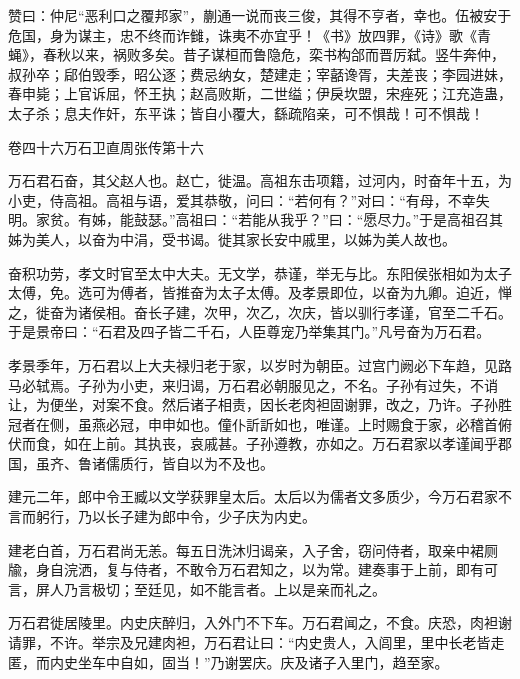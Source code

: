 \documentclass[12pt,UTF8]{ctexbook}
\begin{document}
赞曰：仲尼“恶利口之覆邦家”，蒯通一说而丧三俊，其得不亨者，幸也。伍被安于危国，身为谋主，忠不终而诈雠，诛夷不亦宜乎！《书》放四罪，《诗》歌《青蝇》，春秋以来，祸败多矣。昔子谋桓而鲁隐危，栾书构郃而晋厉弑。竖牛奔仲，叔孙卒；郈伯毁季，昭公逐；费忌纳女，楚建走；宰嚭谗胥，夫差丧；李园进妹，春申毙；上官诉屈，怀王执；赵高败斯，二世缢；伊戾坎盟，宋痤死；江充造蛊，太子杀；息夫作奸，东平诛；皆自小覆大，繇疏陷亲，可不惧哉！可不惧哉！





卷四十六万石卫直周张传第十六



万石君石奋，其父赵人也。赵亡，徙温。高祖东击项籍，过河内，时奋年十五，为小吏，侍高祖。高祖与语，爱其恭敬，问曰：“若何有？”对曰：“有母，不幸失明。家贫。有姊，能鼓瑟。”高祖曰：“若能从我乎？”曰：“愿尽力。”于是高祖召其姊为美人，以奋为中涓，受书谒。徙其家长安中戚里，以姊为美人故也。



奋积功劳，孝文时官至太中大夫。无文学，恭谨，举无与比。东阳侯张相如为太子太傅，免。选可为傅者，皆推奋为太子太傅。及孝景即位，以奋为九卿。迫近，惮之，徙奋为诸侯相。奋长子建，次甲，次乙，次庆，皆以驯行孝谨，官至二千石。于是景帝曰：“石君及四子皆二千石，人臣尊宠乃举集其门。”凡号奋为万石君。



孝景季年，万石君以上大夫禄归老于家，以岁时为朝臣。过宫门阙必下车趋，见路马必轼焉。子孙为小吏，来归谒，万石君必朝服见之，不名。子孙有过失，不诮让，为便坐，对案不食。然后诸子相责，因长老肉袒固谢罪，改之，乃许。子孙胜冠者在侧，虽燕必冠，申申如也。僮仆訢訢如也，唯谨。上时赐食于家，必稽首俯伏而食，如在上前。其执丧，哀戚甚。子孙遵教，亦如之。万石君家以孝谨闻乎郡国，虽齐、鲁诸儒质行，皆自以为不及也。



建元二年，郎中令王臧以文学获罪皇太后。太后以为儒者文多质少，今万石君家不言而躬行，乃以长子建为郎中令，少子庆为内史。



建老白首，万石君尚无恙。每五日洗沐归谒亲，入子舍，窃问侍者，取亲中裙厕牏，身自浣洒，复与侍者，不敢令万石君知之，以为常。建奏事于上前，即有可言，屏人乃言极切；至廷见，如不能言者。上以是亲而礼之。



万石君徙居陵里。内史庆醉归，入外门不下车。万石君闻之，不食。庆恐，肉袒谢请罪，不许。举宗及兄建肉袒，万石君让曰：“内史贵人，入闾里，里中长老皆走匿，而内史坐车中自如，固当！”乃谢罢庆。庆及诸子入里门，趋至家。
\end{document}

